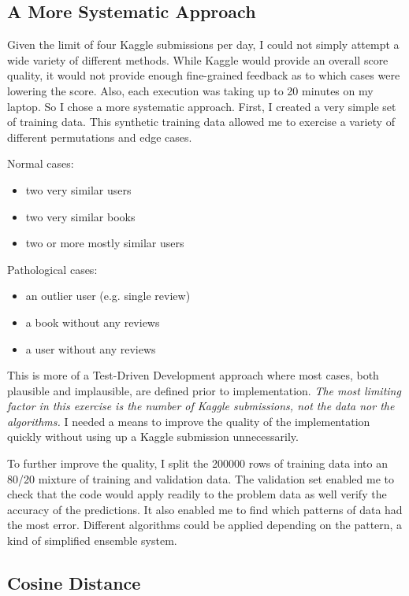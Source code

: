 \documentclass[11pt, oneside]{article}   	%
\begin{document}
\subsection*{A More Systematic Approach}

Given the limit of four Kaggle submissions per day, I could not simply attempt a wide variety of different methods. While Kaggle would provide an overall score quality, it would not provide enough fine-grained feedback as to which cases were lowering the score. Also, each execution was taking up to 20 minutes on my laptop. So I chose a more systematic approach. First, I created a very simple set of training data. This synthetic training data allowed me to exercise a variety of different permutations and edge cases.

Normal cases:
\begin{itemize}
  \item two very similar users
  \item two very similar books
  \item two or more mostly similar users
\end{itemize}

Pathological cases:
\begin{itemize}
  \item an outlier user (e.g. single review)
  \item a book without any reviews
  \item a user without any reviews
\end{itemize}

This is more of a Test-Driven Development approach where most cases, both plausible and implausible, are defined prior to implementation. \emph{The most limiting factor in this exercise is the number of Kaggle submissions, not the data nor the algorithms.} I needed a means to improve the quality of the implementation quickly without using up a Kaggle submission unnecessarily. 

To further improve the quality, I split the 200000 rows of training data into an 80/20 mixture of training and validation data. The validation set enabled me to check that the code would apply readily to the problem data as well verify the accuracy of the predictions. It also enabled me to find which patterns of data had the most error. Different algorithms could be applied depending on the pattern, a kind of simplified ensemble system.

\subsection*{Cosine Distance}
\end{document}
